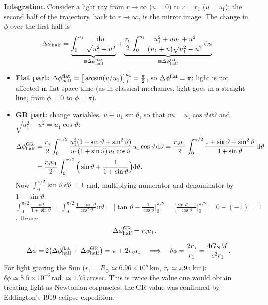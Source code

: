\textbf{Integration.} Consider a light ray from $r\to\infty$ ($u=0$) to $r=r_1$ ($u=u_1$); the second half of the trajectory, back to $r\to\infty$, is the mirror image. The change in $\phi$ over the first half is
\[
  \Delta\phi_{\rm half}=\underbrace{\int_0^{u_1}\frac{\mathrm{d} u}{\sqrt{u_1^2-u^2}}}_{\equiv\Delta\phi^{\rm flat}_{\rm half}}
  +\underbrace{\frac{r_{\mathrm s}}2\int_0^{u_1}\frac{u_1^2+uu_1+u^2}{(u_1+u)\sqrt{u_1^2-u^2}}\,\mathrm{d} u}_{\equiv\Delta\phi^{\rm GR}_{\rm half}} .
\]
\begin{itemize}
\item \textbf{Flat part:} $\Delta\phi^{\rm flat}_{\rm half}=\big[\arcsin(u/u_1)\big]_0^{u_1}=\frac\pi2$, so $\Delta\phi^{\rm flat}=\pi$: light is not affected in flat space-time (as in classical mechanics, light goes in a straight line, from $\phi=0$ to $\phi=\pi$).
\item \textbf{GR part:} change variables, $u\equiv u_1\sin\vartheta$, so that $\dd u=u_1\cos\vartheta\,\dd\vartheta$ and $\sqrt{u_1^2-u^2}=u_1\cos\vartheta$:
\begin{align*}
  \Delta\phi^{\rm GR}_{\rm half}&=\frac{r_{\mathrm s}}2\int_0^{\pi/2}\frac{u_1^2(1+\sin\vartheta+\sin^2\vartheta)}{u_1(1+\sin\vartheta)\,u_1\cos\vartheta}\,u_1\cos\vartheta\,\mathrm{d}\vartheta
  =\frac{r_{\mathrm s} u_1}{2}\int_0^{\pi/2}\frac{1+\sin\vartheta+\sin^2\vartheta}{1+\sin\vartheta}\,\mathrm{d}\vartheta\\
  &=\frac{r_{\mathrm s} u_1}{2}\int_0^{\pi/2}\Big(\sin\vartheta+\frac{1}{1+\sin\vartheta}\Big)\mathrm{d}\vartheta .
\end{align*}
Now $\int_0^{\pi/2}\sin\vartheta\,\dd\vartheta=1$ and, multiplying numerator and denominator by $1-\sin\vartheta$,
$\int_0^{\pi/2}\frac{\dd\vartheta}{1+\sin\vartheta}=\int_0^{\pi/2}\frac{1-\sin\vartheta}{\cos^2\vartheta}\dd\vartheta=\Big[\tan\vartheta-\frac{1}{\cos\vartheta}\Big]_0^{\pi/2}=\Big[\frac{\sin\vartheta-1}{\cos\vartheta}\Big]_0^{\pi/2}=0-(-1)=1$. Hence
\begin{equation}
  \Delta\phi^{\rm GR}_{\rm half}=r_{\mathrm s} u_1 .
\end{equation}
\end{itemize}

\begin{keyresult}
\begin{equation}
  \Delta\phi=2\big(\Delta\phi^{\rm flat}_{\rm half}+\Delta\phi^{\rm GR}_{\rm half}\big)=\pi+2r_{\mathrm s} u_1
  \quad\Longrightarrow\quad\delta\phi=\frac{2r_{\mathrm s}}{r_1}=\frac{4G_{\mathrm N} M}{c^2r_1}.
\end{equation}
For light grazing the Sun ($r_1=R_\odot\simeq6.96\times10^5$\,km, $r_{\mathrm s}\simeq2.95$\,km): $\delta\phi\simeq8.5\times10^{-6}$\,rad $\simeq1.75$\,arcsec. This is twice the value one would obtain treating light as Newtonian corpuscles; the GR value was confirmed by Eddington's 1919 eclipse expedition.
\end{keyresult}

